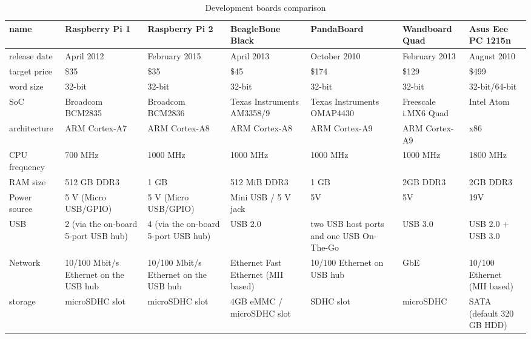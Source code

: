 \documentclass[printmode]{mgr}
\begin{document}
\begin{landscape}

\renewcommand{\arraystretch}{2}
\begin{table}
  \begin{tabular}{| p{2.5cm} | p{3cm} | p{3cm} | p{3.5cm} | p{3.5cm} | p{3cm} | p{3cm} |}
    \hline
    name & Raspberry Pi 1 & Raspberry Pi 2 & BeagleBone Black & PandaBoard & Wandboard Quad & Asus Eee PC 1215n \\
    \hline
    release date & April 2012 & February 2015 & April 2013 & October 2010 & February 2013 & August 2010\\
    \hline
    target price & \$35 & \$35 & \$45 & \$174 & \$129 & \$499\\
    \hline
    word size & 32-bit & 32-bit & 32-bit & 32-bit & 32-bit & 32-bit/64-bit \\
    \hline
    SoC & Broadcom BCM2835 & Broadcom BCM2836 & Texas Instruments AM3358/9 & Texas Instruments OMAP4430 & Freescale i.MX6 Quad & Intel Atom\\
    \hline
    architecture & ARM Cortex-A7 & ARM Cortex-A8 & ARM Cortex-A8 & ARM Cortex-A9 & ARM Cortex-A9 & x86\\
    \hline
    CPU frequency & 700 MHz & 1000 MHz & 1000 MHz & 1000 MHz & 1000 MHz & 1800 MHz\\
    \hline
    RAM size & 512 GB DDR3 & 1 GB & 512 MiB DDR3 & 1 GB & 2GB DDR3 & 2GB DDR3\\
    \hline
    Power source & 5 V (Micro USB/GPIO) & 5 V (Micro USB/GPIO) & Mini USB / 5 V jack & 5V & 5V & 19V\\ %
    \hline
    USB & 2 (via the on-board 5-port USB hub) & 4 (via the on-board 5-port USB hub) & USB 2.0 & two USB host ports and one USB On-The-Go & USB 3.0 & USB 2.0 + USB 3.0\\
    \hline
    Network & 10/100 Mbit/s Ethernet on the USB hub & 10/100 Mbit/s Ethernet on the USB hub  & Ethernet Fast Ethernet (MII based) & 10/100 Ethernet on USB hub & GbE & 10/100 Ethernet (MII based)\\
    \hline
    storage & microSDHC slot & microSDHC slot & 4GB eMMC / microSDHC slot & SDHC slot & microSDHC & SATA (default 320 GB HDD)\\
    \hline
  \end{tabular}
  \caption{Development boards comparison}
\end{table}

\end{landscape}
\end{document}
